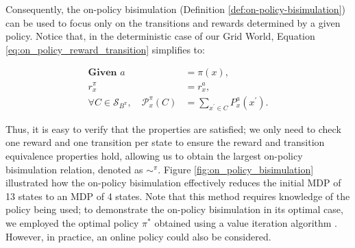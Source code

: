 
Consequently, the on-policy bisimulation (Definition \ref{def:on-policy-bisimulation}) can be used to focus only on the transitions and rewards determined by a given policy. Notice that, in the deterministic case of our Grid World, Equation \ref{eq:on_policy_reward_transition} simplifies to:

\begin{equation}
\begin{aligned}
\textbf{Given } a &= \pi(x), \\
r_x^\pi &= r_x^a, \\
\forall C \in \mathcal{S}_{B^\pi}, \quad \mathcal{P}_x^\pi(C) &= \sum_{x^{\prime} \in C} P_x^a(x^{\prime}).
\end{aligned}
\end{equation}

Thus, it is easy to verify that the properties are satisfied; we only need to check one reward and one transition per state to ensure the reward and transition equivalence properties hold, allowing us to obtain the largest on-policy bisimulation relation, denoted as $\sim^\pi$. Figure \ref{fig:on_policy_bisimulation} illustrated how the on-policy bisimulation effectively reduces the initial MDP of 13 states to an MDP of 4 states. Note that this method requires knowledge of the policy being used; to demonstrate the on-policy bisimulation in its optimal case, we employed the optimal policy $\pi^*$ obtained using a value iteration algorithm \cite{sutton2018reinforcement}. However, in practice, an online policy could also be considered.

